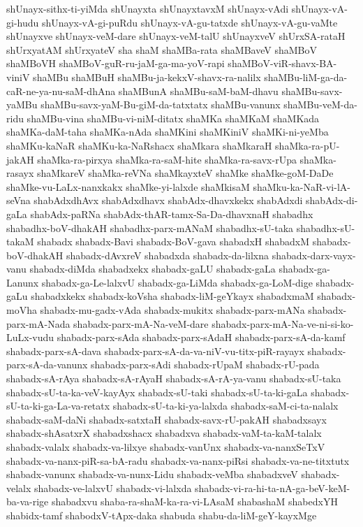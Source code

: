 {shUnayx-sithx-ti-yiMda
shUnayxta
shUnayxtavxM
shUnayx-vAdi
shUnayx-vA-gi-hudu
shUnayx-vA-gi-puRdu
shUnayx-vA-gu-tatxde
shUnayx-vA-gu-vaMte
shUnayxve
shUnayx-veM-dare
shUnayx-veM-talU
shUnayxveV
shUrxSA-rataH
shUrxyatAM
shUrxyateV
sha
shaM
shaMBa-rata
shaMBaveV
shaMBoV
shaMBoVH
shaMBoV-guR-ru-jaM-ga-ma-yoV-rapi
shaMBoV-viR-shavx-BA-viniV
shaMBu
shaMBuH
shaMBu-ja-kekxV-shavx-ra-nalilx
shaMBu-liM-ga-da-caR-ne-ya-nu-saM-dhAna
shaMBunA
shaMBu-saM-baM-dhavu
shaMBu-savx-yaMBu
shaMBu-savx-yaM-Bu-giM-da-tatxtatx
shaMBu-vanunx
shaMBu-veM-da-ridu
shaMBu-vina
shaMBu-vi-niM-ditatx
shaMKa
shaMKaM
shaMKada
shaMKa-daM-taha
shaMKa-nAda
shaMKini
shaMKiniV
shaMKi-ni-yeMba
shaMKu-kaNaR
shaMKu-ka-NaRshacx
shaMkara
shaMkaraH
shaMka-ra-pU-jakAH
shaMka-ra-pirxya
shaMka-ra-saM-hite
shaMka-ra-savx-rUpa
shaMka-rasayx
shaMkareV
shaMka-reVNa
shaMkayxteV
shaMke
shaMke-goM-DaDe
shaMke-vu-LaLx-nanxkakx
shaMke-yi-lalxde
shaMkisaM
shaMku-ka-NaR-vi-lA-seVna
shabAdxdhAvx
shabAdxdhavx
shabAdx-dhavxkekx
shabAdxdi
shabAdx-di-gaLa
shabAdx-paRNa
shabAdx-thAR-tamx-Sa-Da-dhavxnaH
shabadhx
shabadhx-boV-dhakAH
shabadhx-parx-mANaM
shabadhx-sU-taka
shabadhx-sU-takaM
shabadx
shabadx-Bavi
shabadx-BoV-gava
shabadxH
shabadxM
shabadx-boV-dhakAH
shabadx-dAvxreV
shabadxda
shabadx-da-lilxna
shabadx-darx-vayx-vanu
shabadx-diMda
shabadxekx
shabadx-gaLU
shabadx-gaLa
shabadx-ga-Lanunx
shabadx-ga-Le-lalxvU
shabadx-ga-LiMda
shabadx-ga-LoM-dige
shabadx-gaLu
shabadxkekx
shabadx-koVsha
shabadx-liM-geYkayx
shabadxmaM
shabadx-moVha
shabadx-mu-gadx-vAda
shabadx-mukitx
shabadx-parx-mANa
shabadx-parx-mA-Nada
shabadx-parx-mA-Na-veM-dare
shabadx-parx-mA-Na-ve-ni-si-ko-LuLx-vudu
shabadx-parx-sAda
shabadx-parx-sAdaH
shabadx-parx-sA-da-kamf
shabadx-parx-sA-dava
shabadx-parx-sA-da-va-niV-vu-titx-piR-rayayx
shabadx-parx-sA-da-vanunx
shabadx-parx-sAdi
shabadx-rUpaM
shabadx-rU-pada
shabadx-sA-rAya
shabadx-sA-rAyaH
shabadx-sA-rA-ya-vanu
shabadx-sU-taka
shabadx-sU-ta-ka-veV-kayAyx
shabadx-sU-taki
shabadx-sU-ta-ki-gaLa
shabadx-sU-ta-ki-ga-La-va-retatx
shabadx-sU-ta-ki-ya-lalxda
shabadx-saM-ci-ta-nalalx
shabadx-saM-daNi
shabadx-satxtaH
shabadx-savx-rU-pakAH
shabadxsayx
shabadx-shAsatxrX
shabadxshacx
shabadxva
shabadx-vaM-ta-kaM-talalx
shabadx-valalx
shabadx-va-lilxye
shabadx-vanUnx
shabadx-va-nanxSeTxV
shabadx-va-nanx-piR-sa-bA-radu
shabadx-va-nanx-piRsi
shabadx-va-ne-titxtutx
shabadx-vanunx
shabadx-va-nunx-Lidu
shabadx-veMba
shabadxveV
shabadx-velalx
shabadx-ve-lalxvU
shabadx-vi-lalxda
shabadx-vi-ra-hi-ta-nA-ga-beV-keM-ba-va-rige
shabadxvu
shaba-ra-shaM-ka-ra-vi-LAsaM
shabashaM
shabedxYH
shabidx-tamf
shabodxV-tApx-daka
shabuda
shabu-da-liM-geY-kayxMge
}
